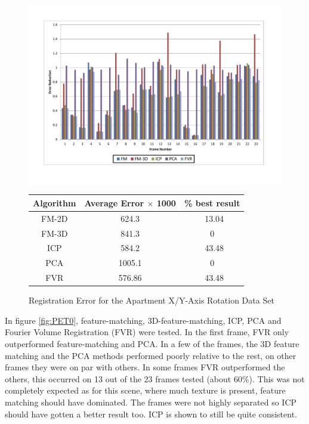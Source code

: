 \begin{figure}
\centering
\includegraphics[width=6in]{images/results/Apartment_Texture_Rotate_XAxis}
\caption{Registration Error for the Apartment X/Y-Axis Rotation Data Set}
\label{fig:PET1}

\begin{tabular}{ccc}
\hline
\textbf{Algorithm} & \textbf{Average Error $\times$ 1000} & \textbf{\% best result}\\ \hline
FM-2D	& 624.3 & ~13.04\\
FM-3D	& 841.3 & 0\\
ICP		& 584.2 & ~43.48\\
PCA		& 1005.1 & 0\\
FVR		& 576.86 & ~43.48\\
\end{tabular}
\label{tab:PET1ST}
\end{figure} 


In figure \ref{fig:PET0}, feature-matching, 3D-feature-matching, ICP, PCA and Fourier Volume Registration (FVR) were tested. In the first frame, FVR only outperformed feature-matching and PCA. In a few of the frames, the 3D feature matching and the PCA methods performed poorly relative to the rest, on other frames they were on par with others. In some frames FVR outperformed the others, this occurred on 13 out of the 23 frames tested (about 60\%). This was not completely expected as for this scene, where much texture is present, feature matching should have dominated. The frames were not highly separated so ICP should have gotten a better result too. ICP is shown to still be quite consistent. \\

